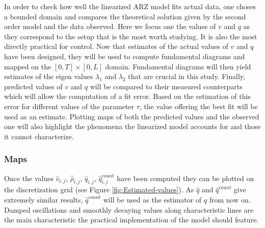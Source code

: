 \documentclass[preprint]{elsarticle}
\begin{document}
In order to check how well the linearized ARZ model fits actual data,
one choses a bounded domain and compares the theoretical solution
given by the second order model and the data observed. Here we focus
one the values of $v$ and $q$ as they correspond to the setup that
is the most worth studying. It is also the most directly practical
for control. Now that estimates of the actual values of $v$ and $q$
have been designed, they will be used to compute fundamental diagrams
and mapped on the $\left[0,T\right]\times\left[0,L\right]$ domain.
Fundamental diagrams will then yield estimates of the eigen values
$\lambda_{1}$ and $\lambda_{2}$ that are crucial in this study.
Finally, predicted values of $v$ and $q$ will be compared to their
measured counterparts which will allow the computation of a fit error.
Based on the estimation of this error for different values of the
parameter $\tau$, the value offering the best fit will be used
as an estimate. Plotting maps of both the predicted values and the
observed one will also highlight the phenomena the linearized model
accounts for and those it cannot characterize.


\subsubsection{Maps}

Once the values $\widehat{v}_{i,j}$, $\widehat{\rho}_{i,j}$, $\widehat{q}_{i,j}$,
$\widehat{q}_{i,j}^{count}$ have been computed they can be plotted
on the discretization grid (see Figure \ref{fig:Estimated-values}).
As $\widehat{q}$ and $\widehat{q}^{count}$ give extremely similar
results, $\widehat{q}^{count}$ will be used as the estimator of $q$
from now on.
Damped oscillations
and smoothly decaying values along characteristic lines are the main characteristic the practical implementation of the model should feature.
\end{document}
